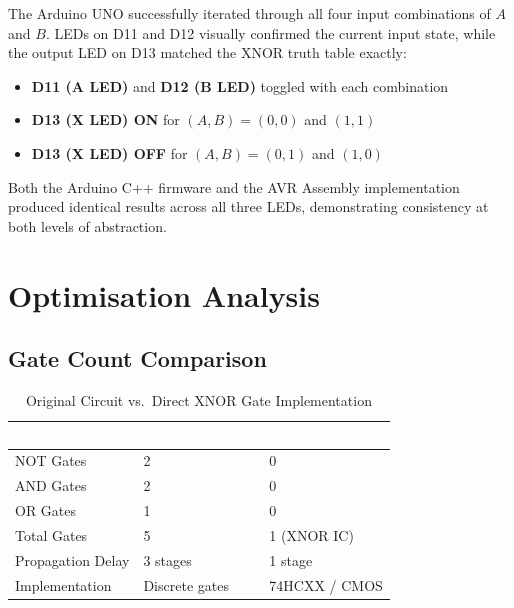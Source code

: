 \documentclass[12pt,a4paper]{article}
\begin{document}
\begin{tcolorbox}[abstractbox, title={Experimental Findings}]
The Arduino UNO successfully iterated through all four input combinations of
$A$ and $B$. LEDs on D11 and D12 visually confirmed the current input state,
while the output LED on D13 matched the XNOR truth table exactly:
\begin{itemize}[itemsep=2pt]
    \item \textbf{D11 (A LED)} and \textbf{D12 (B LED)} toggled with each combination \quad
          \textcolor{checkgreen}{\checkmark}
    \item \textbf{D13 (X LED) ON}  for $(A,B) = (0,0)$ and $(1,1)$ \quad
          \textcolor{checkgreen}{\checkmark}
    \item \textbf{D13 (X LED) OFF} for $(A,B) = (0,1)$ and $(1,0)$ \quad
          \textcolor{checkgreen}{\checkmark}
\end{itemize}
Both the Arduino C++ firmware and the AVR Assembly implementation produced
identical results across all three LEDs, demonstrating consistency at both
levels of abstraction.
\end{tcolorbox}

\section{Optimisation Analysis}

\subsection{Gate Count Comparison}

\begin{table}[H]
\centering

\caption{Original Circuit vs.\ Direct XNOR Gate Implementation}
\vspace{0.07cm}
\renewcommand{\arraystretch}{1.4}
\begin{tabular}{L{5.5cm} C{3cm} C{3cm}}
\toprule
{}
\textcolor{white}{\textbf{Metric}} &
\textcolor{white}{\textbf{Original Circuit}} &
\textcolor{white}{\textbf{Simplified}} \\
\midrule
NOT Gates            & 2 & 0 \\
AND Gates            & 2 & 0 \\
OR Gates             & 1 & 0 \\
Total Gates          & 5 & 1 (XNOR IC) \\
Propagation Delay    & 3 stages & 1 stage \\
Implementation       & Discrete gates & 74HCXX / CMOS \\
\bottomrule
\end{tabular}
\end{table}
\end{document}
